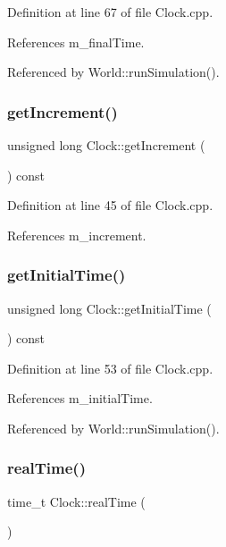 Definition at line 67 of file Clock.\+cpp.



References m\+\_\+final\+Time.



Referenced by World\+::run\+Simulation().

\mbox{\label{class_clock_a804626d5455f4a2a73321f84ed7a9819}} 
\subsubsection{get\+Increment()}
{\footnotesize\ttfamily unsigned long Clock\+::get\+Increment (\begin{DoxyParamCaption}{ }\end{DoxyParamCaption}) const}



Definition at line 45 of file Clock.\+cpp.



References m\+\_\+increment.

\mbox{\label{class_clock_a9792f62fed3c320abecc5c455b13a804}} 
\subsubsection{get\+Initial\+Time()}
{\footnotesize\ttfamily unsigned long Clock\+::get\+Initial\+Time (\begin{DoxyParamCaption}{ }\end{DoxyParamCaption}) const}



Definition at line 53 of file Clock.\+cpp.



References m\+\_\+initial\+Time.



Referenced by World\+::run\+Simulation().

\mbox{\label{class_clock_a29512d39298cafed334d0c01da70ea7b}} 
\subsubsection{real\+Time()}
{\footnotesize\ttfamily time\+\_\+t Clock\+::real\+Time (\begin{DoxyParamCaption}{ }\end{DoxyParamCaption})}



